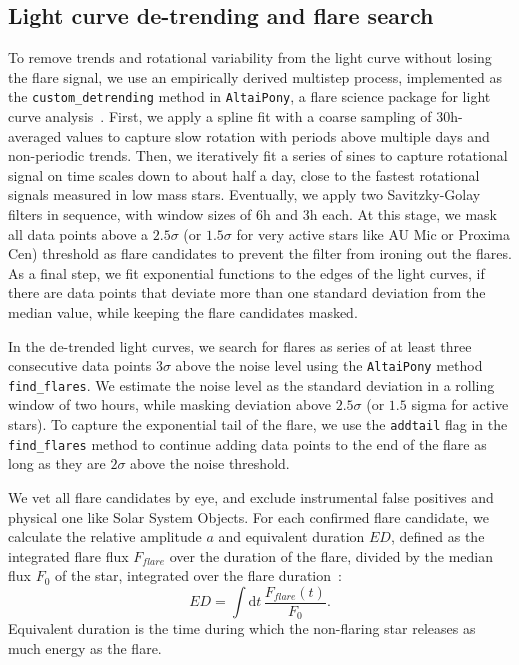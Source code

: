 \documentclass[twocolumn]{aastex631}
\begin{document}
\subsection{Light curve de-trending and flare search}
\label{sec:methods:flaresearch}
To remove trends and rotational variability from the light curve without losing the flare signal, we use an empirically derived multistep process, implemented as the \texttt{custom\_detrending} method in \texttt{AltaiPony}, a flare science package for light curve analysis~\citep{ilin2021altaipony}. First, we apply a spline fit with a coarse sampling of 30h-averaged values to capture slow rotation with periods above multiple days and non-periodic trends. Then, we iteratively fit a series of sines to capture rotational signal on time scales down to about half a day, close to the fastest rotational signals measured in low mass stars. Eventually, we apply two Savitzky-Golay~\citep{savitzky1964smoothing} filters in sequence, with window sizes of 6h and 3h each. At this stage, we mask all data points above a $2.5 \sigma$ (or $1.5 \sigma$ for very active stars like AU Mic or Proxima Cen) threshold as flare candidates to prevent the filter from ironing out the flares. As a final step, we fit exponential functions to the edges of the light curves, if there are data points that deviate more than one standard deviation from the median value, while keeping the flare candidates masked.

In the de-trended light curves, we search for flares as series of at least three consecutive data points $3\sigma$ above the noise level using the \texttt{AltaiPony} method \texttt{find\_flares}. We estimate the noise level as the standard deviation in a rolling window of two hours, while masking deviation above $2.5\sigma$ (or $1.5$ sigma for active stars). To capture the exponential tail of the flare, we use the \texttt{addtail} flag in the \texttt{find\_flares} method to continue adding data points to the end of the flare as long as they are $2\sigma$ above the noise threshold.

We vet all flare candidates by eye, and exclude instrumental false positives and physical one like Solar System Objects. For each confirmed flare candidate, we calculate the relative amplitude $a$ and equivalent duration $ED$, defined as the integrated flare flux $F_{flare}$ over the duration of the flare, divided by the median flux $F_0$ of the star, integrated over the flare duration~\citep{gershberg1972results}:
\begin{equation}
\label{eq:ED}
ED=\displaystyle \int \mathrm dt\, \frac{F_{flare}(t)}{F_0}.
\end{equation}
Equivalent duration is the time during which the non-flaring star releases as much energy as the flare.
\end{document}
